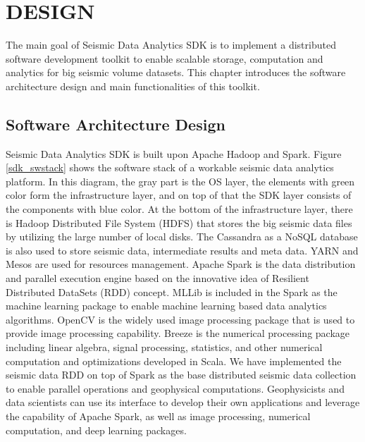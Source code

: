 %
%
%

\chapter{\uppercase{Design}}

The main goal of Seismic Data Analytics SDK is to implement a distributed software development toolkit to enable scalable storage, computation and analytics for big seismic volume datasets. This chapter introduces the software architecture design and main functionalities of this toolkit.

\section{Software Architecture Design}

Seismic Data Analytics SDK is built upon Apache Hadoop and Spark. Figure \ref{sdk_swstack} shows the software stack of a workable seismic data analytics platform. In this diagram, the gray part is the OS layer, the elements with green color form the infrastructure layer, and on top of that the SDK layer consists of the components with blue color. At the bottom of the infrastructure layer, there is Hadoop Distributed File System (HDFS) that stores the big seismic data files by utilizing the large number of local disks. The Cassandra as a NoSQL database is also used to store seismic data, intermediate results and meta data. YARN and Mesos are used for resources management. Apache Spark is the data distribution and parallel execution engine based on the innovative idea of Resilient Distributed DataSets (RDD) concept. MLLib is included in the Spark as the machine learning package to enable machine learning based data analytics algorithms. OpenCV is the widely used image processing package that is used to provide image processing capability. Breeze is the numerical processing package including linear algebra, signal processing, statistics, and other numerical computation and optimizations developed in Scala. We have implemented the seismic data RDD on top of Spark as the base distributed seismic data collection to enable parallel operations and geophysical computations. Geophysicists and data scientists can use its interface to develop their own applications and leverage the capability of Apache Spark, as well as image processing, numerical computation, and deep learning packages.

